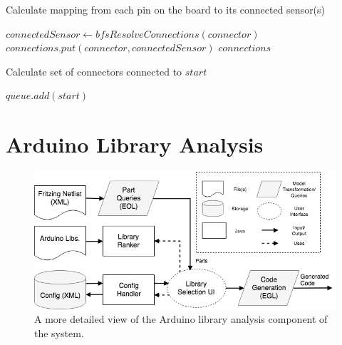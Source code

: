 \documentclass{UoYCSproject}
\begin{document}
\begin{algorithm}
\caption{Calculate mapping from each pin on the board to its connected sensor(s)}
\begin{algorithmic}[1]
\State $connectedSensor \leftarrow bfsResolveConnections(connector)$
\State $connections.put(connector, connectedSensor)$
\EndFor
\Return $connections$
\\
\EndProcedure
\end{algorithmic}
\end{algorithm}

\begin{algorithm}
\caption{Calculate set of connectors connected to $start$}
\begin{algorithmic}[1]
\State $queue.add(start)$

		\Else
				\EndFor
			\EndIf
		\EndIf
	\EndIf
\EndWhile
\EndProcedure
\end{algorithmic}
\end{algorithm}

\section{Arduino Library Analysis}
\begin{figure}[h!]
  \centering
  \includegraphics[width=0.8\linewidth]{graphics/arduino_library_analysis.png}
  \caption{A more detailed view of the Arduino library analysis component of the system.}
  \label{fig:arduino_analysis}
\end{figure}
\end{document}
